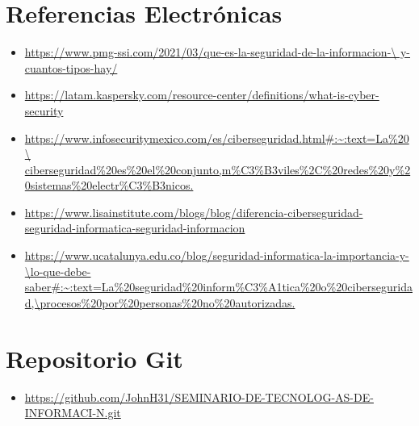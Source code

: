 \documentclass[12pt]{article}
\begin{document}
\section*{Referencias Electrónicas}
\begin{itemize}
    \item \url{https://www.pmg-ssi.com/2021/03/que-es-la-seguridad-de-la-informacion-\ y-cuantos-tipos-hay/}    
    \item \url{https://latam.kaspersky.com/resource-center/definitions/what-is-cyber-security}
    \item \url{https://www.infosecuritymexico.com/es/ciberseguridad.html#:~:text=La%20 \ ciberseguridad%20es%20el%20conjunto,m%C3%B3viles%2C%20redes%20y%20sistemas%20electr%C3%B3nicos.}
    \item \url{https://www.lisainstitute.com/blogs/blog/diferencia-ciberseguridad-seguridad-informatica-seguridad-informacion}

        \item \url{https://www.ucatalunya.edu.co/blog/seguridad-informatica-la-importancia-y-\lo-que-debe-saber#:~:text=La%20seguridad%20inform%C3%A1tica%20o%20ciberseguridad,\procesos%20por%20personas%20no%20autorizadas.}
\end{itemize}

\section*{Repositorio Git}
\begin{itemize}
    \item \url{https://github.com/JohnH31/SEMINARIO-DE-TECNOLOG-AS-DE-INFORMACI-N.git}
\end{itemize}
\end{document}
